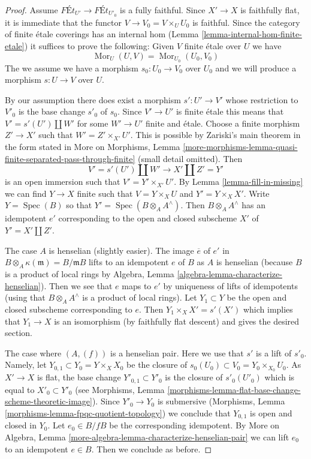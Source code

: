 \documentclass{stacks-project}
\theoremstyle{plain}
\theoremstyle{definition}
\theoremstyle{remark}
\numberwithin{equation}{subsection}
\def\Spec{\mathop{\mathrm{Spec}}}
\def\Mor{\mathop{\mathrm{Mor}}\nolimits}
\begin{document}
\begin{proof}
Assume $\textit{F\'Et}_{U'} \longrightarrow \textit{F\'Et}_{U'_0}$
is a fully faithful. Since $X' \to X$ is faithfully flat, it is
immediate that the functor $V \to V_0 = V \times_U U_0$ is faithful.
Since the category of finite \'etale coverings has an internal hom
(Lemma \ref{lemma-internal-hom-finite-etale})
it suffices to prove the following: Given $V$ finite \'etale over $U$
we have
$$
\Mor_U(U, V) = \Mor_{U_0}(U_0, V_0)
$$
The we assume we have a morphism $s_0 : U_0 \to V_0$ over $U_0$ and we will
produce a morphism $s : U \to V$ over $U$.

\medskip\noindent
By our assumption there does exist a morphism $s' : U' \to V'$
whose restriction to $V'_0$ is the base change $s'_0$ of $s_0$.
Since $V' \to U'$ is finite \'etale this means that $V' = s'(U') \amalg W'$
for some $W' \to U'$ finite and \'etale.
Choose a finite morphism $Z' \to X'$ such that $W' = Z' \times_{X'} U'$.
This is possible by Zariski's main theorem in the form stated in
More on Morphisms, Lemma
\ref{more-morphisms-lemma-quasi-finite-separated-pass-through-finite}
(small detail omitted).
Then
$$
V' = s'(U') \amalg W' \longrightarrow X' \amalg Z' = Y'
$$
is an open immersion such that $V' = Y' \times_{X'} U'$.
By Lemma \ref{lemma-fill-in-missing} we can find $Y \to X$ finite
such that $V = Y \times_X U$ and $Y' = Y \times_X X'$.
Write $Y = \Spec(B)$ so that $Y' = \Spec(B \otimes_A A^\wedge)$.
Then $B \otimes_A A^\wedge$ has an idempotent $e'$
corresponding to the open and closed subscheme $X'$ of $Y' = X' \amalg Z'$.

\medskip\noindent
The case $A$ is henselian (slightly easier). The image $\overline{e}$
of $e'$ in $B \otimes_A \kappa(\mathfrak m) = B/\mathfrak mB$ lifts to an
idempotent $e$ of $B$ as $A$ is henselian (because $B$ is a product of
local rings by Algebra, Lemma \ref{algebra-lemma-characterize-henselian}).
Then we see that $e$ maps to $e'$ by uniqueness of lifts of idempotents
(using that $B \otimes_A A^\wedge$ is a product of local rings).
Let $Y_1 \subset Y$ be the open and closed subscheme corresponding to $e$.
Then $Y_1 \times_X X' = s'(X')$ which implies that $Y_1 \to X$ is
an isomorphism (by faithfully flat descent) and gives the desired section.

\medskip\noindent
The case where $(A, (f))$ is a henselian pair. Here we use that $s'$ is
a lift of $s'_0$. Namely, let $Y_{0, 1} \subset Y_0 = Y \times_X X_0$
be the closure of $s_0(U_0) \subset V_0 = Y_0 \times_{X_0} U_0$.
As $X' \to X$ is flat, the base change $Y'_{0, 1} \subset Y'_0$
is the closure of $s'_0(U'_0)$ which is equal to $X'_0 \subset Y'_0$
(see Morphisms, Lemma
\ref{morphisms-lemma-flat-base-change-scheme-theoretic-image}).
Since $Y'_0 \to Y_0$ is submersive
(Morphisms, Lemma \ref{morphisms-lemma-fpqc-quotient-topology})
we conclude that $Y_{0, 1}$ is open and closed in $Y_0$.
Let $e_0 \in B/fB$ be the corresponding idempotent.
By More on Algebra, Lemma
\ref{more-algebra-lemma-characterize-henselian-pair}
we can lift $e_0$ to an idempotent $e \in B$.
Then we conclude as before.
\end{proof}
\end{document}
